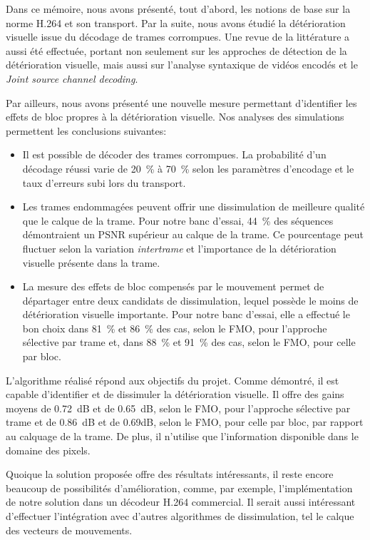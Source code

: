 Dans ce mémoire, nous avons présenté, tout d'abord, les notions de base sur la
norme H.264 et son transport. Par la suite, nous avons étudié la détérioration
visuelle issue du décodage de trames corrompues. Une revue de la littérature a
aussi été effectuée, portant non seulement sur les approches de détection de la
détérioration visuelle, mais aussi sur l'analyse syntaxique de vidéos encodés et
le \textit{Joint source channel decoding}.

Par ailleurs, nous avons présenté une nouvelle mesure permettant d'identifier
les effets de bloc propres à la détérioration visuelle. Nos analyses des
simulations permettent les conclusions suivantes:
\begin{itemize}
\item Il est possible de décoder des trames corrompues. La probabilité d'un
décodage réussi varie de 20~\% à 70~\% selon les paramètres d'encodage et le
taux d'erreurs subi lors du transport.
\item Les trames endommagées peuvent offrir une dissimulation de meilleure
qualité que le calque de la trame. Pour notre banc d'essai, 44~\% des séquences
démontraient un PSNR supérieur au calque de la trame. Ce pourcentage peut
fluctuer selon la variation \textit{intertrame} et l'importance de la
détérioration visuelle présente dans la trame.
\item La mesure des effets de bloc compensés par le mouvement permet de
départager entre deux candidats de dissimulation, lequel possède le moins de
détérioration visuelle importante. Pour notre banc d'essai, elle a effectué le
bon choix dans 81~\% et 86~\% des cas, selon le FMO, pour l'approche sélective
par trame et, dans 88~\% et 91~\% des cas, selon le FMO, pour celle par bloc.
\end{itemize}

L'algorithme réalisé répond aux objectifs du projet. Comme démontré, il est
capable d'identifier et de dissimuler la détérioration visuelle. Il offre des
gains moyens de 0.72~dB et de 0.65~dB, selon le FMO, pour l'approche sélective
par trame et de 0.86~dB et de 0.69dB, selon le FMO, pour celle par bloc, par
rapport au calquage de la trame. De plus, il n'utilise que l'information
disponible dans le domaine des pixels.

Quoique la solution proposée offre des résultats intéressants, il reste encore
beaucoup de possibilités d'amélioration, comme, par exemple, l'implémentation de
notre solution dans un décodeur H.264 commercial. Il serait aussi intéressant
d'effectuer l'intégration avec d'autres algorithmes de dissimulation, tel le
calque des vecteurs de mouvements. 

